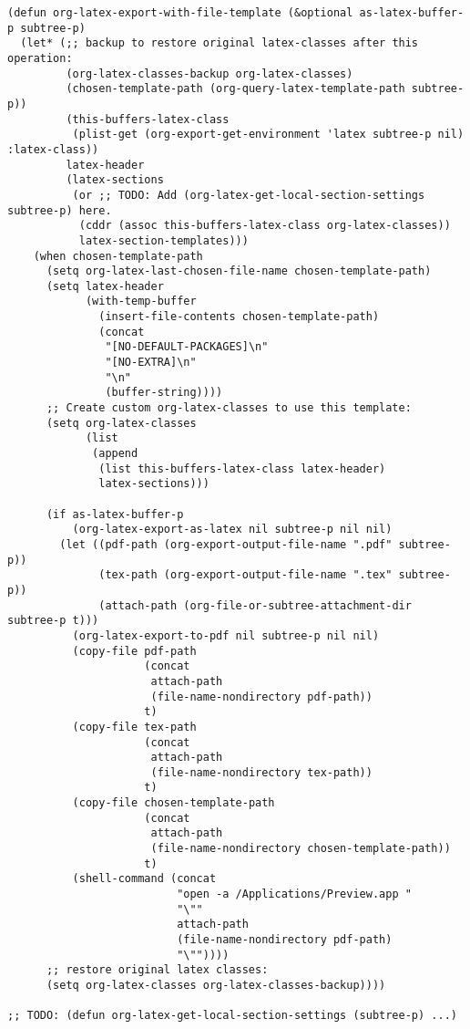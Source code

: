 \documentclass[nofonts]{tufte-handout}
\begin{document}
\begin{enumerate}
\begin{enumerate}
\begin{verbatim}
(defun org-latex-export-with-file-template (&optional as-latex-buffer-p subtree-p)
  (let* (;; backup to restore original latex-classes after this operation:
         (org-latex-classes-backup org-latex-classes)
         (chosen-template-path (org-query-latex-template-path subtree-p))
         (this-buffers-latex-class
          (plist-get (org-export-get-environment 'latex subtree-p nil) :latex-class))
         latex-header
         (latex-sections
          (or ;; TODO: Add (org-latex-get-local-section-settings subtree-p) here.
           (cddr (assoc this-buffers-latex-class org-latex-classes))
           latex-section-templates)))
    (when chosen-template-path
      (setq org-latex-last-chosen-file-name chosen-template-path)
      (setq latex-header
            (with-temp-buffer
              (insert-file-contents chosen-template-path)
              (concat
               "[NO-DEFAULT-PACKAGES]\n"
               "[NO-EXTRA]\n"
               "\n"
               (buffer-string))))
      ;; Create custom org-latex-classes to use this template:
      (setq org-latex-classes
            (list
             (append
              (list this-buffers-latex-class latex-header)
              latex-sections)))

      (if as-latex-buffer-p
          (org-latex-export-as-latex nil subtree-p nil nil)
        (let ((pdf-path (org-export-output-file-name ".pdf" subtree-p))
              (tex-path (org-export-output-file-name ".tex" subtree-p))
              (attach-path (org-file-or-subtree-attachment-dir subtree-p t)))
          (org-latex-export-to-pdf nil subtree-p nil nil)
          (copy-file pdf-path
                     (concat
                      attach-path
                      (file-name-nondirectory pdf-path))
                     t)
          (copy-file tex-path
                     (concat
                      attach-path
                      (file-name-nondirectory tex-path))
                     t)
          (copy-file chosen-template-path
                     (concat
                      attach-path
                      (file-name-nondirectory chosen-template-path))
                     t)
          (shell-command (concat
                          "open -a /Applications/Preview.app "
                          "\""
                          attach-path
                          (file-name-nondirectory pdf-path)
                          "\""))))
      ;; restore original latex classes:
      (setq org-latex-classes org-latex-classes-backup))))

;; TODO: (defun org-latex-get-local-section-settings (subtree-p) ...)


\end{verbatim}
\end{enumerate}
\end{enumerate}
\end{document}

